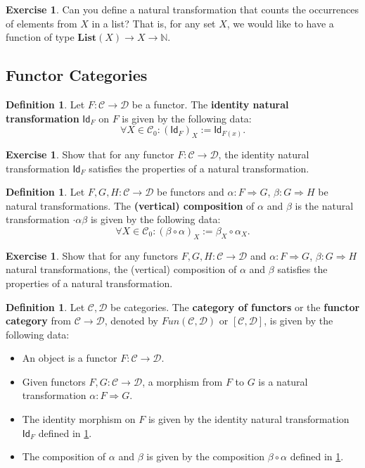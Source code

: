 \documentclass[a4paper,11pt, oneside,titlepage=false]{scrbook}
\theoremstyle{plain}
\theoremstyle{definition}
\newtheorem{dfn}[thm]{Definition}
\newtheorem{exer}[thm]{Exercise}
\newcommand{\cfont}[1]{\ensuremath{\mathsf{#1}}}
\newcommand{\Cat}[1]{\mathcal{#1}}
\newcommand{\CC}{\Cat{C}}
\newcommand{\DD}{\Cat{D}}
\newcommand{\Catb}[1]{\mathbf{#1}}
\newcommand{\List}{\Catb{List}}
\newcommand{\Ob}[1]{{#1}_0}
\newcommand{\Id}[1][]{\cfont{Id}_{#1}}
\newcommand{\Comp}{\cdot}
\newcommand{\NatTrans}[3]{#1 : #2 \Rightarrow #3}
\newcommand{\co}[2]{\ensuremath{#2 \circ #1}}
\newcommand{\NN}{\ensuremath{\mathbb{N}}}
\begin{document}
\begin{exer}
  Can you define a natural transformation that counts the occurrences of elements from $X$ in a list?
  That is, for any set $X$, we would like to have a function of type $\List(X) \to X \to \NN$.
\end{exer}

\subsection{Functor Categories}
\begin{dfn}\label{dfn:nattrans_id} Let $F:\CC\to\DD$ be a functor. The \textbf{identity natural transformation} $\Id[F]$ on $F$ is given by the following data:
\[
\forall X\in\Ob{\CC}: (\Id[F])_{X} := \Id[F(x)].
\]
\end{dfn}

\begin{exer} Show that for any functor $F:\CC\to\DD$, the identity natural transformation $\Id[F]$ satisfies the properties of a natural transformation.
\end{exer}

\begin{dfn}\label{dfn:nattrans_comp} Let $F,G,H: \CC\to\DD$ be functors and $\NatTrans{\alpha}{F}{G}$, $\NatTrans{\beta}{G}{H}$ be natural transformations. The \textbf{(vertical) composition} of $\alpha$ and $\beta$ is the natural transformation $\Comp{\alpha}{\beta}$ is given by the following data:
\[
\forall X\in\Ob{\CC}: (\co{\alpha}{\beta})_{X} := \co{\alpha_X}{\beta_X}.
\]
\end{dfn}

\begin{exer} Show that for any functors $F,G,H: \CC\to\DD$ and $\NatTrans{\alpha}{F}{G}$, $\NatTrans{\beta}{G}{H}$ natural transformations, the (vertical) composition of $\alpha$ and $\beta$ satisfies the properties of a natural transformation.
\end{exer}

\begin{dfn} Let $\CC,\DD$ be categories. The \textbf{category of functors} or the \textbf{functor category} from $\CC\to\DD$, denoted by $Fun(\CC,\DD)$ or $[\CC,\DD]$, is given by the following data:
\begin{itemize}
\item An object is a functor $F:\CC\to\DD$.
\item Given functors $F, G:\CC\to\DD$, a morphism from $F$ to $G$ is a natural transformation $\NatTrans{\alpha}{F}{G}$.
\item The identity morphism on $F$ is given by the identity natural transformation $\Id[F]$ defined in \cref{dfn:nattrans_id}.
\item The composition of $\alpha$ and $\beta$ is given by the composition $\co{\alpha}{\beta}$ defined in \cref{dfn:nattrans_comp}.
\end{itemize}
\end{dfn}
\end{document}
